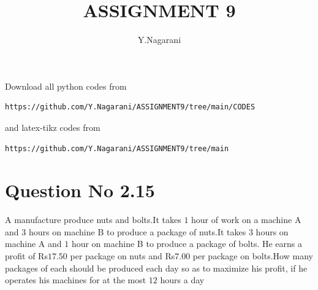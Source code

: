 \documentclass[journal,12pt,twocolumn]{IEEEtran}
\begin{document}
     \def\rightbox#1{\makebox[0in][r]{#1}}
     \def\centbox#1{\makebox[0in]{#1}}
     \def\topbox#1{\raisebox{-\baselineskip}[0in][0in]{#1}}
     \def\midbox#1{\raisebox{-0.5\baselineskip}[0in][0in]{#1}}
\vspace{3cm}
\title{ASSIGNMENT 9}
\author{Y.Nagarani}
\maketitle
\newpage
\bigskip
\renewcommand{\thefigure}{\theenumi}
\renewcommand{\thetable}{\theenumi}
Download all python codes from 
\begin{lstlisting}
https://github.com/Y.Nagarani/ASSIGNMENT9/tree/main/CODES
\end{lstlisting}
%
and latex-tikz codes from 
%
\begin{lstlisting}
https://github.com/Y.Nagarani/ASSIGNMENT9/tree/main
\end{lstlisting}
%
\section{Question No 2.15}
A manufacture produce nuts and bolts.It takes $1$ hour of work on a machine A and $3$ hours on machine B to produce a package of nuts.It takes $3$ hours on machine A and $1$ hour on machine B to produce a package of bolts. He earns a profit of Rs$17.50$ per package on nuts and Rs$7.00$ per package on bolts.How many packages of each should be produced each day so as to maximize his profit, if he operates his machines for at the most $12$ hours a day
%
\end{document}
